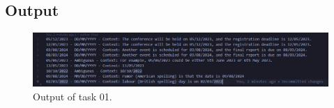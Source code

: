 \documentclass[a4paper,12pt]{article}
\begin{document}
            











\subsection{Output}


\begin{figure}[h!]
    \centering
    \includegraphics[width=\textwidth]{Fig1.png}
    \caption{Output of task 01.}
    \label{fig:output_image}
\end{figure}
\end{document}
